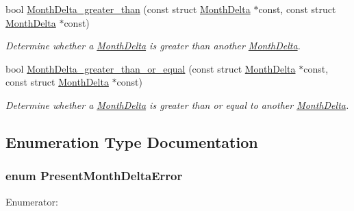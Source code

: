 \begin{DoxyCompactItemize}
bool \hyperlink{month-delta_8h_a87f541ed67c5071e5bf359f08a0c4413}{\-Month\-Delta\-\_\-greater\-\_\-than} (const struct \hyperlink{structMonthDelta}{\-Month\-Delta} $\ast$const, const struct \hyperlink{structMonthDelta}{\-Month\-Delta} $\ast$const)
\begin{DoxyCompactList}\small\item\em \-Determine whether a \hyperlink{structMonthDelta}{\-Month\-Delta} is greater than another \hyperlink{structMonthDelta}{\-Month\-Delta}. \end{DoxyCompactList}\item 
bool \hyperlink{month-delta_8h_ac025396048e81af1dc75bc21b7a7c3a8}{\-Month\-Delta\-\_\-greater\-\_\-than\-\_\-or\-\_\-equal} (const struct \hyperlink{structMonthDelta}{\-Month\-Delta} $\ast$const, const struct \hyperlink{structMonthDelta}{\-Month\-Delta} $\ast$const)
\begin{DoxyCompactList}\small\item\em \-Determine whether a \hyperlink{structMonthDelta}{\-Month\-Delta} is greater than or equal to another \hyperlink{structMonthDelta}{\-Month\-Delta}. \end{DoxyCompactList}\end{DoxyCompactItemize}


\subsection{\-Enumeration \-Type \-Documentation}
\hypertarget{month-delta_8h_aee28c4c9b4054448713e954a7944cb51}{
\subsubsection[{\-Present\-Month\-Delta\-Error}]{\setlength{\rightskip}{0pt plus 5cm}enum {\bf \-Present\-Month\-Delta\-Error}}}\label{month-delta_8h_aee28c4c9b4054448713e954a7944cb51}
\begin{Desc}
\item[\-Enumerator\-: ]\par
\begin{description}
\item[{\em 
\hypertarget{month-delta_8h_aee28c4c9b4054448713e954a7944cb51a880d48faec79524a948ad81b1ab2e87e}{\-Month\-Delta\-\_\-\-E\-R\-R\-O\-R\-\_\-\-N\-O\-N\-E}\label{month-delta_8h_aee28c4c9b4054448713e954a7944cb51a880d48faec79524a948ad81b1ab2e87e}
}]\end{description}
\end{Desc}



